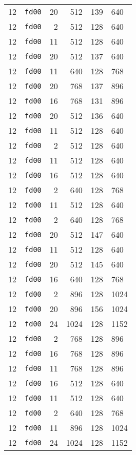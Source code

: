 \documentclass{article}
\begin{document}
\begin{table}[h!]
\begin{tabular}{llrrrl}
    12 & \texttt{fd00} & 20 & 512 & 139 & 640 \\
    12 & \texttt{fd00} & 2 & 512 & 128 & 640 \\
    12 & \texttt{fd00} & 11 & 512 & 128 & 640 \\
    12 & \texttt{fd00} & 20 & 512 & 137 & 640 \\
    12 & \texttt{fd00} & 11 & 640 & 128 & 768 \\
    12 & \texttt{fd00} & 20 & 768 & 137 & 896 \\
    12 & \texttt{fd00} & 16 & 768 & 131 & 896 \\
    12 & \texttt{fd00} & 20 & 512 & 136 & 640 \\
    12 & \texttt{fd00} & 11 & 512 & 128 & 640 \\
    12 & \texttt{fd00} & 2 & 512 & 128 & 640 \\
    12 & \texttt{fd00} & 11 & 512 & 128 & 640 \\
    12 & \texttt{fd00} & 16 & 512 & 128 & 640 \\
    12 & \texttt{fd00} & 2 & 640 & 128 & 768 \\
    12 & \texttt{fd00} & 11 & 512 & 128 & 640 \\
    12 & \texttt{fd00} & 2 & 640 & 128 & 768 \\
    12 & \texttt{fd00} & 20 & 512 & 147 & 640 \\
    12 & \texttt{fd00} & 11 & 512 & 128 & 640 \\
    12 & \texttt{fd00} & 20 & 512 & 145 & 640 \\
    12 & \texttt{fd00} & 16 & 640 & 128 & 768 \\
    12 & \texttt{fd00} & 2 & 896 & 128 & 1024 \\
    12 & \texttt{fd00} & 20 & 896 & 156 & 1024 \\
    12 & \texttt{fd00} & 24 & 1024 & 128 & 1152 \\
    12 & \texttt{fd00} & 2 & 768 & 128 & 896 \\
    12 & \texttt{fd00} & 16 & 768 & 128 & 896 \\
    12 & \texttt{fd00} & 11 & 768 & 128 & 896 \\
    12 & \texttt{fd00} & 16 & 512 & 128 & 640 \\
    12 & \texttt{fd00} & 11 & 512 & 128 & 640 \\
    12 & \texttt{fd00} & 2 & 640 & 128 & 768 \\
    12 & \texttt{fd00} & 11 & 896 & 128 & 1024 \\
    12 & \texttt{fd00} & 24 & 1024 & 128 & 1152 \\

\end{tabular}
\end{table}
\end{document}
